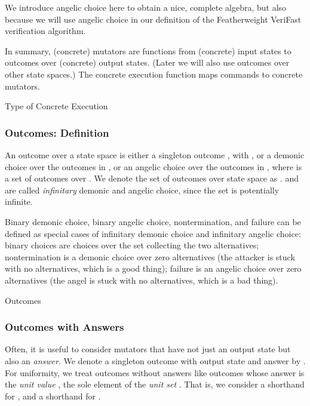 \documentclass{CSML}
\theoremstyle{definition}\newtheorem{notation}[thm]{Notation}
\theoremstyle{plain}\newtheorem{satz}[thm]{Satz}
\begin{document}
We introduce angelic choice here to obtain a nice, complete 
algebra, but also because we will use angelic choice in our 
definition of the Featherweight VeriFast verification 
algorithm.

In summary, (concrete) mutators are functions from (concrete) 
input states to outcomes over (concrete) output states. (Later 
we will also use outcomes over other state spaces.) The 
concrete execution function  maps commands to 
concrete mutators. 

\begin{defi}{Type of Concrete Execution}



\end{defi}

\subsubsection{Outcomes: Definition}

An outcome  over a state space 
 is either a singleton outcome , 
with , or a demonic choice 
over the outcomes in ,
or an angelic choice 
over the outcomes in ,
where  is a set of outcomes over .
We denote the set of outcomes over state 
space  as .
 and  are called \emph{infinitary} demonic and angelic choice, since
the set  is potentially infinite.

Binary demonic choice, binary angelic choice, nontermination, 
and failure can be defined as special cases of infinitary demonic 
choice and infinitary angelic choice: binary choices are
choices over the set collecting the two alternatives; nontermination is a demonic 
choice over zero alternatives (the attacker is stuck with no 
alternatives, which is a good thing); failure is an angelic 
choice over zero alternatives (the angel is stuck with no 
alternatives, which is a bad thing). 

\begin{defi}{Outcomes}







\end{defi}

\subsubsection{Outcomes with Answers}

Often, it is useful to consider mutators that have not just an output state but also an \emph{answer}.
We denote a singleton outcome with output state  and answer  by .
For uniformity, we treat outcomes without answers like outcomes whose answer is the \emph{unit value} , the sole element of the
\emph{unit set} . That is, we consider  a shorthand for ,
and  a shorthand for .
\end{document}
